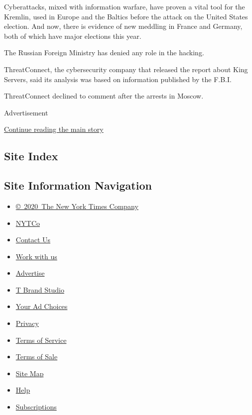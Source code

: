 Cyberattacks, mixed with information warfare, have proven a vital tool
for the Kremlin, used in Europe and the Baltics before the attack on the
United States election. And now, there is evidence of new meddling in
France and Germany, both of which have major elections this year.

The Russian Foreign Ministry has denied any role in the hacking.

ThreatConnect, the cybersecurity company that released the report about
King Servers, said its analysis was based on information published by
the F.B.I.

ThreatConnect declined to comment after the arrests in Moscow.

Advertisement

\protect\hyperlink{after-bottom}{Continue reading the main story}

\hypertarget{site-index}{%
\subsection{Site Index}\label{site-index}}

\hypertarget{site-information-navigation}{%
\subsection{Site Information
Navigation}\label{site-information-navigation}}

\begin{itemize}
\tightlist
\item
  \href{https://help.nytimes.com/hc/en-us/articles/115014792127-Copyright-notice}{©~2020~The
  New York Times Company}
\end{itemize}

\begin{itemize}
\tightlist
\item
  \href{https://www.nytco.com/}{NYTCo}
\item
  \href{https://help.nytimes.com/hc/en-us/articles/115015385887-Contact-Us}{Contact
  Us}
\item
  \href{https://www.nytco.com/careers/}{Work with us}
\item
  \href{https://nytmediakit.com/}{Advertise}
\item
  \href{http://www.tbrandstudio.com/}{T Brand Studio}
\item
  \href{https://www.nytimes.com/privacy/cookie-policy\#how-do-i-manage-trackers}{Your
  Ad Choices}
\item
  \href{https://www.nytimes.com/privacy}{Privacy}
\item
  \href{https://help.nytimes.com/hc/en-us/articles/115014893428-Terms-of-service}{Terms
  of Service}
\item
  \href{https://help.nytimes.com/hc/en-us/articles/115014893968-Terms-of-sale}{Terms
  of Sale}
\item
  \href{https://spiderbites.nytimes.com}{Site Map}
\item
  \href{https://help.nytimes.com/hc/en-us}{Help}
\item
  \href{https://www.nytimes.com/subscription?campaignId=37WXW}{Subscriptions}
\end{itemize}

